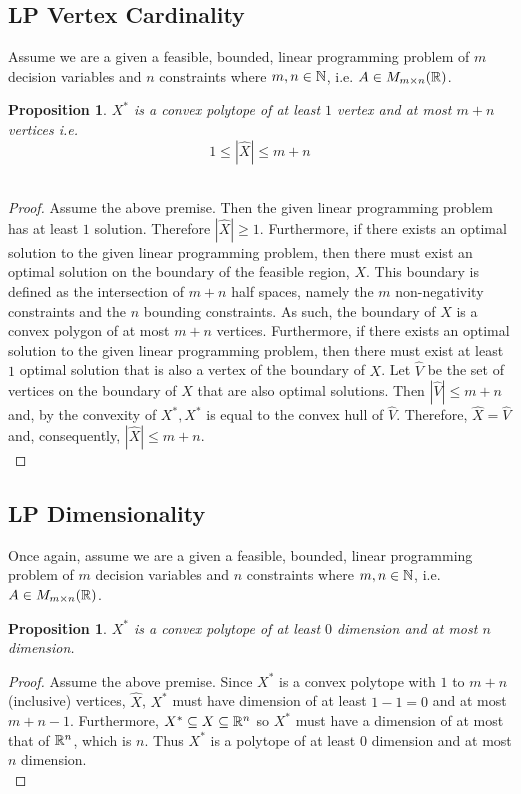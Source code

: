 \documentclass[conference]{IEEEtran}
\numberwithin{equation}{section}
\numberwithin{figure}{section}
\theoremstyle{plain}
\newtheorem{prop}[equation]{Proposition}
\theoremstyle{definition}
\newcommand{\R}{\ensuremath \mathbb{R}}
\newcommand{\N}{\ensuremath \mathbb{N}}
\newcommand{\1}{\ensuremath \mathbbm{1}}
\begin{document}
\subsection{LP Vertex Cardinality}
Assume we are a given a feasible, bounded, linear programming problem of $m$ 
decision variables and $n$ constraints where $m,n \in \N$, i.e. $A \in 
M_{m \times n}(\R)$. \\
\begin{prop}
$X^*$ is a convex polytope of at least $1$ vertex and at most $m + n$ vertices 
i.e. \\ 
\[1 \leq |\hat{X}| \leq m+n\] \\
\end{prop}
\begin{proof}
Assume the above premise. Then the given linear programming problem has at least 
$1$ solution. Therefore $|\hat{X}| \geq 1$. Furthermore, if there exists an 
optimal solution to the given linear programming problem, then there must exist 
an optimal solution on the boundary of the feasible region, $X$. This boundary 
is defined as the intersection of $m+n$ half spaces, namely the $m$ 
non-negativity constraints and the $n$ bounding constraints. As such, the 
boundary of $X$ is a convex polygon of at most $m+n$ vertices. Furthermore, if 
there exists an optimal solution to the given linear programming problem, then 
there must exist at least $1$ optimal solution that is also a vertex of the 
boundary of $X$. Let $\hat{V}$ be the set of vertices on the boundary of $X$ that 
are also optimal solutions. Then $|\hat{V}| \leq m+n$ and, by the convexity of 
$X^*, X^*$ is equal to the convex hull of $\hat{V}$. Therefore, $\hat{X} = 
\hat{V}$ and, consequently, $|\hat{X}| \leq m+n$. \\
\end{proof}

\subsection{LP Dimensionality}
Once again, assume we are a given a feasible, bounded, linear programming problem 
of $m$ decision variables and $n$ constraints where $m,n \in \N$, i.e. $A \in 
M_{m \times n}(\R)$. \\
\begin{prop}
$X^*$ is a convex polytope of at least $0$ dimension and at most $n$ dimension. \\
\end{prop}
\begin{proof}
Assume the above premise. Since $X^*$ is a convex polytope with $1$ to $m+n$ 
(inclusive) vertices, $\hat{X}$, $X^*$ must have dimension of at least $1-1 = 0$ 
and at most $m+n-1$. Furthermore, $X^* \subseteq X \subseteq \R^n$ so $X^*$ must 
have a dimension of at most that of $\R^n$, which is $n$. Thus $X^*$ is a 
polytope of at least $0$ dimension and at most $n$ dimension. \\
\end{proof}
\end{document}
